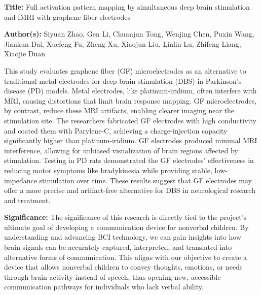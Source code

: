 \documentclass[12pt, research paper]{report}
\begin{document}
	\noindent \textbf{Title:} Full activation pattern mapping by simultaneous deep brain stimulation and fMRI with graphene fiber electrodes
	
	\noindent \textbf{Author(s):} Siyuan Zhao, Gen Li, Chuanjun Tong, Wenjing Chen, Puxin Wang, Jiankun Dai, Xuefeng Fu, Zheng Xu, Xiaojun Liu, Linlin Lu, Zhifeng Liang, Xiaojie Duan
	\bigskip 

	This study evaluates graphene fiber (GF) microelectrodes as an alternative to traditional metal electrodes for deep brain stimulation (DBS) in Parkinson’s disease (PD) models. Metal electrodes, like platinum-iridium, often interfere with MRI, causing distortions that limit brain response mapping. GF microelectrodes, by contrast, reduce these MRI artifacts, enabling clearer imaging near the stimulation site. The researchers fabricated GF electrodes with high conductivity and coated them with Parylene-C, achieving a charge-injection capacity significantly higher than platinum-iridium. GF electrodes produced minimal MRI interference, allowing for unbiased visualization of brain regions affected by stimulation. Testing in PD rats demonstrated the GF electrodes’ effectiveness in reducing motor symptoms like bradykinesia while providing stable, low-impedance stimulation over time. These results suggest that GF electrodes may offer a more precise and artifact-free alternative for DBS in neurological research and treatment.
	\bigskip 
	
	\noindent \textbf{Significance:} The significance of this research is directly tied to the project’s ultimate goal of developing a communication device for nonverbal children. By understanding and advancing BCI technology, we can gain insights into how brain signals can be accurately captured, interpreted, and translated into alternative forms of communication. This aligns with our objective to create a device that allows nonverbal children to convey thoughts, emotions, or needs through brain activity instead of speech, thus opening new, accessible communication pathways for individuals who lack verbal ability.

	
	
	
	
\end{document}
